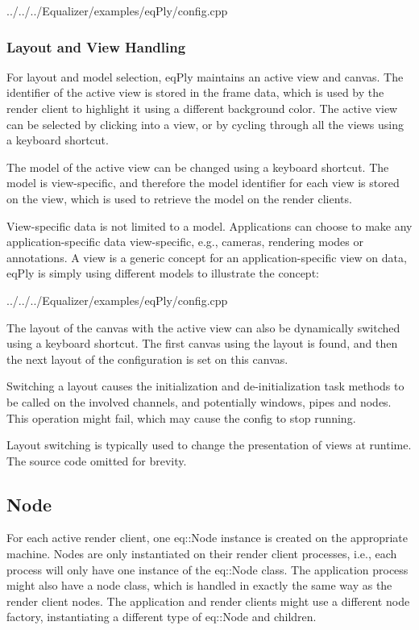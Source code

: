 \documentclass[10pt,a4]{scrartcl}
\begin{document}
{\footnotesize
  {../../../Equalizer/examples/eqPly/config.cpp}}

\subsubsection{Layout and View Handling}

For layout and model selection, \textsf{eqPly} maintains an active view
and canvas. The identifier of the active view is stored in the frame
data, which is used by the render client to highlight it using a
different background color. The active view can be selected by clicking
into a view, or by cycling through all the views using a keyboard
shortcut.

The model of the active view can be changed using a keyboard
shortcut. The model is view-specific, and therefore the model identifier
for each view is stored on the view, which is used to retrieve the model
on the render clients. 

View-specific data is not limited to a model. Applications can choose to make
any application-specific data view-specific, e.g., cameras, rendering modes or
annotations. A view is a generic concept for an application-specific view on
data, \textsf{eqPly} is simply using different models to illustrate the concept:

{\footnotesize
  {../../../Equalizer/examples/eqPly/config.cpp}}

The layout of the canvas with the active view can also be dynamically
switched using a keyboard shortcut. The first canvas using the layout is
found, and then the next layout of the configuration is set on this
canvas. 

Switching a layout causes the initialization and de-initialization task
methods to be called on the involved channels, and potentially windows,
pipes and nodes. This operation might fail, which may cause the config
to stop running.

Layout switching is typically used to change the presentation of views
at runtime. The source code omitted for brevity.


\subsection{Node}

For each active render client, one \textsf{eq::Node} instance is created on the
appropriate machine. Nodes are only instantiated on their render client
processes, i.e., each process will only have one instance of the
\textsf{eq::Node} class. The application process might also have a node class,
which is handled in exactly the same way as the render client nodes. The
application and render clients might use a different node factory, instantiating
a different type of \textsf{eq::Node} and children.
\end{document}
